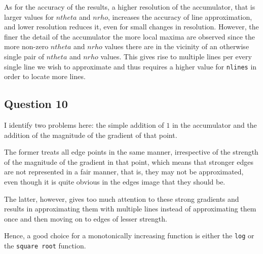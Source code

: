     As for the accuracy of the results, a higher resolution of the accumulator,
    that is larger values for $ntheta$ and $nrho$, increases the accuracy
    of line approximation, and lower resolution reduces it, even for small
    changes in resolution. However, the finer the detail of the accumulator
    the more local maxima are observed since the more non-zero $ntheta$ and $nrho$
    values there are in the vicinity of an otherwise single pair of
    $ntheta$ and $nrho$ values. This gives rise to multiple lines per every
    single line we wish to approximate and thus requires a higher value for
    \texttt{nlines} in order to locate more lines.


  \subsection{Question 10}
    I identify two problems here: the simple addition of $1$ in the accumulator
    and the addition of the magnitude of the gradient of that point.

    The former treats all edge points in the same manner, irrespective of the
    strength of the magnitude of the gradient in that point, which means that
    stronger edges are not represented in a fair manner, that is, they may not be
    approximated, even though it is quite obvious in the edges image that
    they should be.

    The latter, however, gives too much attention to these strong gradients
    and results in approximating them with multiple lines instead of approximating
    them once and then moving on to edges of lesser strength.

    Hence, a good choice for a monotonically increasing function is either the
    \texttt{log} or the \texttt{square root} function.


